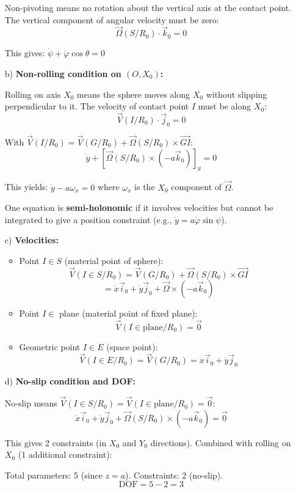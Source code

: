 \documentclass[12pt]{article}
\begin{document}
\begin{correctionbox}
\begin{enumerate}
    Non-pivoting means no rotation about the vertical axis at the contact point. The vertical component of angular velocity must be zero:
    $$\vec{\Omega}(S/R_0) \cdot \vec{k}_0 = 0$$
    
    This gives: $\dot{\psi} + \dot{\varphi}\cos\theta = 0$
    
    \item[b)] \textbf{Non-rolling condition on $(O, X_0)$:}
    
    Rolling on axis $X_0$ means the sphere moves along $X_0$ without slipping perpendicular to it. The velocity of contact point $I$ must be along $X_0$:
    $$\vec{V}(I/R_0) \cdot \vec{j}_0 = 0$$
    
    With $\vec{V}(I/R_0) = \vec{V}(G/R_0) + \vec{\Omega}(S/R_0) \times \overrightarrow{GI}$:
    $$\dot{y} + [\vec{\Omega}(S/R_0) \times (-a\vec{k}_0)]_y = 0$$
    
    This yields: $\dot{y} - a\omega_x = 0$ where $\omega_x$ is the $X_0$ component of $\vec{\Omega}$.
    
    One equation is \textbf{semi-holonomic} if it involves velocities but cannot be integrated to give a position constraint (e.g., $\dot{y} = a\dot{\varphi}\sin\psi$).
    
    \item[c)] \textbf{Velocities:}
    
    \begin{itemize}
        \item Point $I \in S$ (material point of sphere):
        $$\vec{V}(I \in S/R_0) = \vec{V}(G/R_0) + \vec{\Omega}(S/R_0) \times \overrightarrow{GI}$$
        $$= \dot{x}\vec{i}_0 + \dot{y}\vec{j}_0 + \vec{\Omega} \times (-a\vec{k}_0)$$
        
        \item Point $I \in$ plane (material point of fixed plane):
        $$\vec{V}(I \in \text{plane}/R_0) = \vec{0}$$
        
        \item Geometric point $I \in E$ (space point):
        $$\vec{V}(I \in E/R_0) = \vec{V}(G/R_0) = \dot{x}\vec{i}_0 + \dot{y}\vec{j}_0$$
    \end{itemize}
    
    \item[d)] \textbf{No-slip condition and DOF:}
    
    No-slip means $\vec{V}(I \in S/R_0) = \vec{V}(I \in \text{plane}/R_0) = \vec{0}$:
    $$\dot{x}\vec{i}_0 + \dot{y}\vec{j}_0 + \vec{\Omega}(S/R_0) \times (-a\vec{k}_0) = \vec{0}$$
    
    This gives 2 constraints (in $X_0$ and $Y_0$ directions). Combined with rolling on $X_0$ (1 additional constraint):
    
    Total parameters: 5 (since $z = a$). Constraints: 2 (no-slip).
    $$\text{DOF} = 5 - 2 = 3$$
\end{enumerate}
\end{correctionbox}
\end{document}
